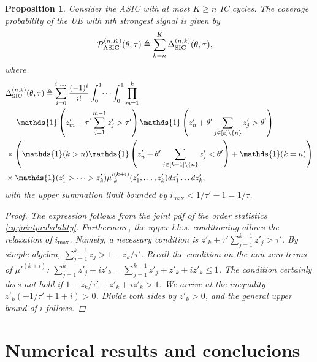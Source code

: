 \documentclass[lettersize,journal]{IEEEtran}
\newtheorem{prop}[theorem]{Proposition}
\begin{document}
\begin{prop}
  Consider the ASIC with at most $K \geq n$ IC cycles. The coverage probability of the UE with n\textit{th} strongest signal is given by
  \begin{align}
    &\mathcal{P}^{(n,K)}_{\textup{ASIC}}(\theta,\tau) \triangleq \sum_{k=n}^{K}\Delta^{(n,k)}_{\textup{SIC}}(\theta,\tau),
  \end{align}
  where
  \begin{align}
    \label{eq:SICprob}
    & \Delta^{(n,k)}_{\textup{SIC}}(\theta,\tau) \triangleq \sum^{i_{\text{max}}}_{i=0}\frac{(-1)^i}{i!} \int_{0}^{1} \dots \int_{0}^{1}\prod_{m=1}^k  \nonumber \\
    &\hspace{0.5cm}\mathds{1}\left( z'_m+ \tau'\sum_{j=1}^{m-1} z'_j>\tau' \right)  \mathds{1}\left(z'_n+  \theta'\sum_{j\in [k] \setminus \{n\}} z'_j>\theta' \right) \nonumber \\
    &\times \left(\mathds{1}(k>n)\mathds{1}\left(z'_n+ \theta'\sum_{j \in [k-1] \setminus \{n\}} z'_j<\theta' \right) + \mathds{1}(k=n) \right) \nonumber\\
    & \times \mathds{1}(z'_1>\dots>z'_k){\mu'}_k^{(k+i)}(z'_1,\dots,z'_k) d z'_1 \dots d z'_k,
  \end{align}
  with the upper summation limit bounded by $i_{\text{max}} < 1/\tau'-1=1/\tau$.
  \begin{proof}
    The expression follows from the joint pdf of the order statistics \eqref{eq:jointprobability}. Furthermore, the upper l.h.s. conditioning  allows the relaxation of $i_{\text{max}}$. Namely, a necessary condition is $z'_{k}+\tau'\sum_{j=1}^{k-1}z'_{j}>\tau'$. By simple algebra, $\sum_{j=1}^{k-1}z_{j}> 1-z_{k}/\tau'$. Recall the condition on the non-zero terms of $\mu'^{(k+i)}$:  $\sum_{j=1}^k z'_{j}+i z'_{k} =\sum_{j=1}^{k-1}z'_{j} +z'_{k}+i z'_{k}  \leq 1$. The condition certainly does \textit{not} hold if $1-z_{k}/\tau'+ z'_{k}+i z'_{k}>1$. We arrive at the inequality $z'_{k} \left(-1/\tau' + 1 +i \right)>0$. Divide both sides by $z'_{k}>0$, and the general upper bound of $i$ follows.
  \end{proof}
\end{prop}




\section{Numerical results and conclucions}
  
\end{document}
